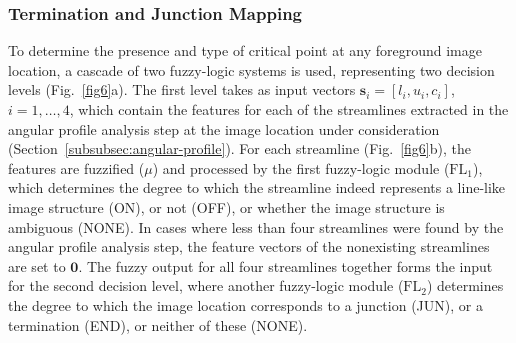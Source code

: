 \subsubsection{Termination and Junction Mapping}
\label{sec:cp-detection}
To determine the presence and type of critical point at any foreground image location, a cascade of two fuzzy-logic systems is used, representing two decision levels (Fig.~\ref{fig6}a). The first level takes as input vectors $\mathbf{s}_{i}=[l_{i},u_{i},c_{i}]$, $i=1,\dots,4$, which contain the features for each of the streamlines extracted in the angular profile analysis step at the image location under consideration (Section~\ref{subsubsec:angular-profile}). For each streamline (Fig.~\ref{fig6}b), the features are fuzzified ($\mu$) and processed by the first fuzzy-logic module ($\textrm{FL}_{1}$), which determines the degree to which the streamline indeed represents a line-like image structure (ON), or not (OFF), or whether the image structure is ambiguous (NONE). In cases where less than four streamlines were found by the angular profile analysis step, the feature vectors of the nonexisting streamlines are set to $\mathbf{0}$. The fuzzy output for all four streamlines together forms the input for the second decision level, where another fuzzy-logic module ($\textrm{FL}_{2}$) determines the degree to which the image location corresponds to a junction (JUN), or a termination (END), or neither of these (NONE).

